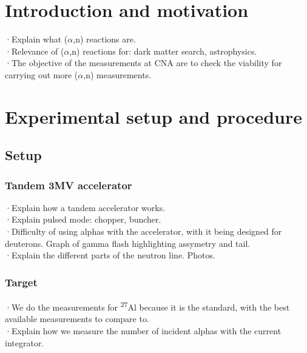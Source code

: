 \documentclass[a4paper,12pt]{report}
\author{Erik Cárdenas Mayoral}
\title{\HUGE{Title}}
\date{date}
\newcommand{\an}{($\alpha$,n) }
\newcommand{\Aliso}{\textsuperscript{27}Al }
\begin{document}
\maketitle

\begin{abstract}
Abstract
\end{abstract}

\tableofcontents

\chapter{Introduction and motivation}
·Explain what \an reactions are.\\

·Relevance of \an reactions for: dark matter search, astrophysics.\\

·The objective of the measurements at CNA are to check the viability for carrying out more \an measurements.\\


\chapter{Experimental setup and procedure}
\section{Setup}
\subsection{Tandem 3MV accelerator}
·Explain how a tandem accelerator works.\\
·Explain pulsed mode: chopper, buncher.\\
·Difficulty of using alphas with the accelerator, with it being designed for deuterons. Graph of gamma flash highlighting assymetry and tail.\\

·Explain the different parts of the neutron line. Photos.\\

\subsection{Target}
·We do the measurements for \Aliso because it is the standard, with the best available measurements to compare to.\\
·Explain how we measure the number of incident alphas with the current integrator.\\
\end{document}
